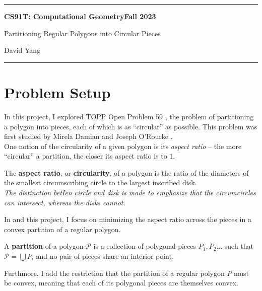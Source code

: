 \documentclass[11pt]{article}
\begin{document}
\hrule
\begin{center}
    \textbf{CS91T: Computational Geometry}\hfill \textbf{Fall 2023}\newline

    {\Large Partitioning Regular Polygons into Circular Pieces}

    David Yang
\end{center}

\hrule

\vspace{1em}

\section{Problem Setup}
In this project, I explored TOPP Open Problem 59 \cite{topp}, the problem of partitioning a polygon into pieces, each of which is as
``circular'' as possible. This problem was first studied by Mirela Damian and Joseph O'Rourke \cite{damian_rourke}. \\


One notion of the circularity of a given polygon is its \textit{aspect ratio} -- the more ``circular'' a partition, the closer its aspect ratio is to $1$.

\begin{definition}
The \textbf{aspect ratio}, or \textbf{circularity}, of a polygon is the ratio of the diameters of the smallest circumscribing circle to the largest inscribed disk. \\

\textit{The distinction betIen circle and disk is made to emphasize that the circumcircles can intersect, whereas the disks cannot.}
\end{definition}

In \cite{topp} and this project, I focus on minimizing the aspect ratio across the pieces in a convex partition of a regular polygon.

\begin{definition}[Partition]
A \textbf{partition} of a polygon $\mathcal{P}$ is a collection of polygonal pieces $P_1, P_2 \dots $ such that $\mathcal{P} = \bigcup P_i$ and no pair of pieces share an interior point. 
\end{definition}

Furthmore, I add the restriction that the partition of a regular polygon $P$ must be convex, meaning that each of its polygonal pieces are themselves convex. \\
\end{document}
